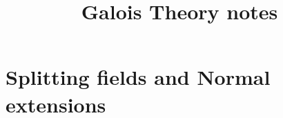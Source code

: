 \documentclass[twoside, a4paper, 10pt]{amsart}
\title[ ]{Galois Theory notes}
\begin{document}
\maketitle
\raggedbottom


\newcommand{\cA}{\mathcal{A}}
\newcommand{\cB}{\mathcal{B}}
\newcommand{\cC}{\mathcal{C}}
\newcommand{\cD}{\mathcal{D}}
\newcommand{\cE}{\mathcal{E}}
\newcommand{\cF}{\mathcal{F}}
\newcommand{\cG}{\mathcal{G}}
\newcommand{\cH}{\mathcal{H}}
\newcommand{\cI}{\mathcal{I}}
\newcommand{\cJ}{\mathcal{J}}
\newcommand{\cK}{\mathcal{K}}
\newcommand{\cL}{\mathcal{L}}
\newcommand{\cM}{\mathcal{M}}
\newcommand{\cN}{\mathcal{N}}
\newcommand{\cO}{\mathcal{O}}
\newcommand{\cP}{\mathcal{P}}
\newcommand{\cQ}{\mathcal{Q}}
\newcommand{\cR}{\mathcal{R}}
\newcommand{\cS}{\mathcal{S}}
\newcommand{\cT}{\mathcal{T}}
\newcommand{\cU}{\mathcal{U}}
\newcommand{\cV}{\mathcal{V}}
\newcommand{\cW}{\mathcal{W}}
\newcommand{\cX}{\mathcal{X}}
\newcommand{\cY}{\mathcal{Y}}
\newcommand{\cZ}{\mathcal{Z}}
\newcommand{\bA}{\mathbb{A}}
\newcommand{\bB}{\mathbb{B}}
\newcommand{\bC}{\mathbb{C}}
\newcommand{\bD}{\mathbb{D}}
\newcommand{\bE}{\mathbb{E}}
\newcommand{\bF}{\mathbb{F}}
\newcommand{\bG}{\mathbb{G}}
\newcommand{\bH}{\mathbb{H}}
\newcommand{\bI}{\mathbb{I}}
\newcommand{\bJ}{\mathbb{J}}
\newcommand{\bK}{\mathbb{K}}
\newcommand{\bL}{\mathbb{L}}
\newcommand{\bM}{\mathbb{M}}
\newcommand{\bN}{\mathbb{N}}
\newcommand{\bO}{\mathbb{O}}
\newcommand{\bP}{\mathbb{P}}
\newcommand{\bQ}{\mathbb{Q}}
\newcommand{\bR}{\mathbb{R}}
\newcommand{\bS}{\mathbb{S}}
\newcommand{\bT}{\mathbb{T}}
\newcommand{\bU}{\mathbb{U}}
\newcommand{\bV}{\mathbb{V}}
\newcommand{\bW}{\mathbb{W}}
\newcommand{\bX}{\mathbb{X}}
\newcommand{\bY}{\mathbb{Y}}
\newcommand{\bZ}{\mathbb{Z}}


 

\theoremstyle{definition}
\newtheorem{mydef}[dummy]{Definition}
\newtheorem{prop}[dummy]{Proposition}
\newtheorem{corol}[dummy]{Corollary}
\newtheorem{thm}[dummy]{Theorem}
\newtheorem{lemma}[dummy]{Lemma}
\newtheorem{eg}[dummy]{Example}
\newtheorem{notation}[dummy]{Notation}
\newtheorem{remark}[dummy]{Remark}
\newtheorem{claim}[dummy]{Claim}
\newtheorem{Exercise}[dummy]{Exercise}
\newtheorem{question}[dummy]{Question}
\newtheorem{conjecture}[dummy]{Conjecture}

\section{Splitting fields and Normal extensions}
\end{document}
